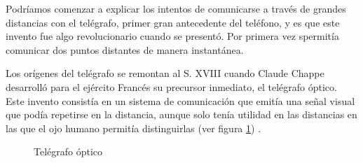 Podríamos comenzar a explicar los intentos de comunicarse a través de grandes distancias con el telégrafo, primer gran antecedente del teléfono, y es que este invento fue algo revolucionario cuando se presentó. Por primera vez spermitía comunicar dos puntos distantes de manera instantánea.

Los orígenes del telégrafo se remontan al S. XVIII cuando Claude Chappe desarrolló para el ejército Francés su precursor inmediato, el telégrafo óptico. Este invento consistía en un sistema de comunicación que emitía una señal visual que podía repetirse en la distancia, aunque solo tenía utilidad en las distancias en las que el ojo humano permitía distinguirlas (ver figura \ref{fig:telegrafo_optico}) \cite{Holz94}.

\begin{figure}[h!btp]
	\begin{adjustbox}{minipage=\linewidth, fbox}
		\centering
		\hspace{10mm}
	\end{adjustbox}
\caption{Telégrafo óptico}
	\label{fig:telegrafo_optico}
\end{figure}

